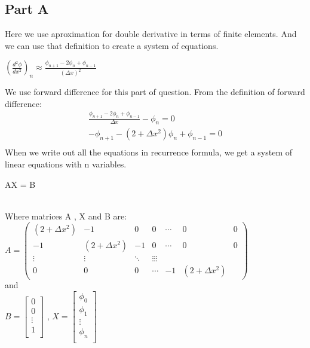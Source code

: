 \documentclass{article}
\begin{document}
     \subsection{Part A} %
     \label{sub:part_a}
     Here we use aproximation for double derivative in terms of finite elements. And we can use that definition to create a system of equations.\\
    \centerline{$(\frac{d^2 \phi}{d x^2})_n \approx \frac{\phi_{n+1} - 2\phi_{n}+\phi_{n-1}}{(\Delta x)^2}$}
    We use forward difference for this part of question. From the definition of forward difference:\\
    \begin{align}
     \frac{\phi_{n+1} - 2\phi_{n} + \phi_{n-1}}{\Delta x} - \phi_{n} = 0 \\ \nonumber
     -\phi_{n+1} -(2+ \Delta x^2)\phi_{n} + \phi_{n-1} = 0 \\ \nonumber
     \end{align}
    When we write out all the equations in recurrence formula, we get a system of linear equations with n variables.\\
     \centerline{AX = B}\\
     Where matrices A , X and B are:\\
     $A = 
     \begin{pmatrix}
      (2+ \Delta x^2) & -1 & 0 & 0 & \cdots & 0 & 0\\
     -1 & (2+ \Delta x^2) & -1 & 0& \cdots & 0 &0\\
     \vdots  & \vdots  & \ddots & \vdots \vdots \vdots \\
    0 & 0 & 0 & \cdots & -1 &(2+ \Delta x^2)
     \end{pmatrix}$\\
     and\\
     $B =
     \begin{bmatrix}
     0 \\
     0 \\
     \vdots \\
     1 \\    
     \end{bmatrix}$
     , \hspace{6mm}
     $X =
     \begin{bmatrix}
     \phi _0 \\
     \phi _1 \\
     \vdots \\
     \phi _n \\    
     \end{bmatrix}$\\
\end{document}
